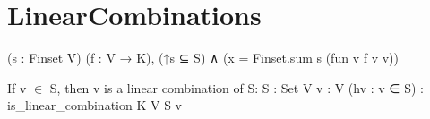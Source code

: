 \section{LinearCombinations}

\begin{definition}
  \label{definition : linear_combination}
  \leanok
  \exists (s : Finset V) (f : V → K), (↑s ⊆ S) ∧ (x = Finset.sum s (fun v \Rightarrow f v \bullet v))
\end{definition}

\begin{theorem}
  \label{theorem : linear_combination_of_mem}
  \leanok
  If v $\in$ S, then v is a linear combination of S: {S : Set V} {v : V} (hv : v ∈ S) : is_linear_combination K V S v
\end{theorem}
